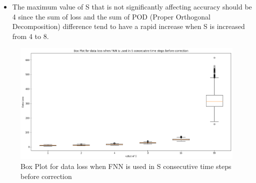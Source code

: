 {\begin{itemize}
\begin{itemize}
            \item The maximum value of S that is not significantly affecting accuracy should be 4 since the sum of loss and the sum of POD (Proper Orthogonal Decomposition) difference tend to have a rapid increase when S is increased from 4 to 8.
        \end{itemize}          
\end{itemize}

\begin{figure}[H]
    \includegraphics[width=\linewidth]{figures/FNN_boxplot.png}
    \caption{Box Plot for data loss when FNN is used in S consecutive time steps before correction}
\end{figure}

}


